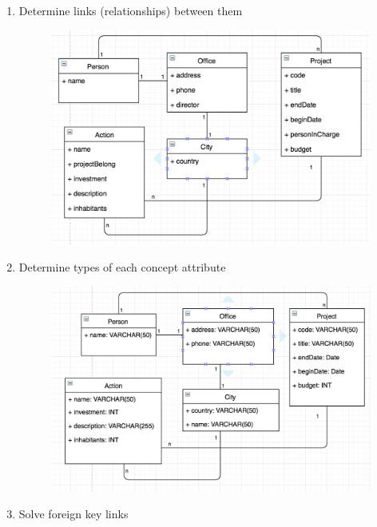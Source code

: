 \documentclass[12pt]{article}
\begin{document}
\begin{enumerate}
\item Determine links (relationships) between them
\begin{figure}[H]
\includegraphics[width=\textwidth]{relations.png}
\end{figure}


\item Determine types of each concept attribute 

\begin{figure}[H]
\includegraphics[width=\textwidth]{types.png}
\end{figure}


\item Solve foreign key links


\end{enumerate}
\end{document}
